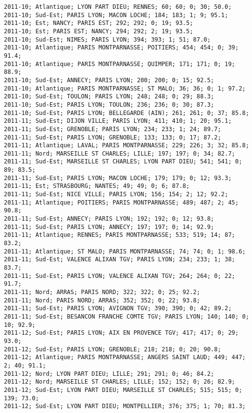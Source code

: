 \documentclass{article}
\begin{document}
\begin{Verbatim}[commandchars=\\\{\}]
2011-10; Atlantique; LYON PART DIEU; RENNES; 60; 60; 0; 30; 50.0; 
2011-10; Sud-Est; PARIS LYON; MACON LOCHE; 184; 183; 1; 9; 95.1; 
2011-10; Est; NANCY; PARIS EST; 292; 292; 0; 19; 93.5; 
2011-10; Est; PARIS EST; NANCY; 294; 292; 2; 19; 93.5; 
2011-10; Sud-Est; NIMES; PARIS LYON; 394; 393; 1; 51; 87.0; 
2011-10; Atlantique; PARIS MONTPARNASSE; POITIERS; 454; 454; 0; 39; 91.4; 
2011-10; Atlantique; PARIS MONTPARNASSE; QUIMPER; 171; 171; 0; 19; 88.9; 
2011-10; Sud-Est; ANNECY; PARIS LYON; 200; 200; 0; 15; 92.5; 
2011-10; Atlantique; PARIS MONTPARNASSE; ST MALO; 36; 36; 0; 1; 97.2; 
2011-10; Sud-Est; TOULON; PARIS LYON; 248; 248; 0; 29; 88.3; 
2011-10; Sud-Est; PARIS LYON; TOULON; 236; 236; 0; 30; 87.3; 
2011-10; Sud-Est; PARIS LYON; BELLEGARDE (AIN); 261; 261; 0; 37; 85.8; 
2011-11; Sud-Est; DIJON VILLE; PARIS LYON; 411; 410; 1; 20; 95.1; 
2011-11; Sud-Est; GRENOBLE; PARIS LYON; 234; 233; 1; 24; 89.7; 
2011-11; Sud-Est; PARIS LYON; GRENOBLE; 133; 133; 0; 17; 87.2; 
2011-11; Atlantique; LAVAL; PARIS MONTPARNASSE; 229; 226; 3; 32; 85.8; 
2011-11; Nord; MARSEILLE ST CHARLES; LILLE; 197; 197; 0; 34; 82.7; 
2011-11; Sud-Est; MARSEILLE ST CHARLES; LYON PART DIEU; 541; 541; 0; 89; 83.5; 
2011-11; Sud-Est; PARIS LYON; MACON LOCHE; 179; 179; 0; 12; 93.3; 
2011-11; Est; STRASBOURG; NANTES; 49; 49; 0; 6; 87.8; 
2011-11; Sud-Est; NICE VILLE; PARIS LYON; 156; 154; 2; 12; 92.2; 
2011-11; Atlantique; POITIERS; PARIS MONTPARNASSE; 489; 487; 2; 45; 90.8; 
2011-11; Sud-Est; ANNECY; PARIS LYON; 192; 192; 0; 12; 93.8; 
2011-11; Sud-Est; PARIS LYON; ANNECY; 197; 197; 0; 14; 92.9; 
2011-11; Atlantique; RENNES; PARIS MONTPARNASSE; 533; 519; 14; 87; 83.2; 
2011-11; Atlantique; ST MALO; PARIS MONTPARNASSE; 74; 74; 0; 1; 98.6; 
2011-11; Sud-Est; VALENCE ALIXAN TGV; PARIS LYON; 234; 233; 1; 38; 83.7; 
2011-11; Sud-Est; PARIS LYON; VALENCE ALIXAN TGV; 264; 264; 0; 22; 91.7; 
2011-11; Nord; ARRAS; PARIS NORD; 322; 322; 0; 25; 92.2; 
2011-11; Nord; PARIS NORD; ARRAS; 352; 352; 0; 22; 93.8; 
2011-11; Sud-Est; PARIS LYON; AVIGNON TGV; 390; 390; 0; 42; 89.2; 
2011-11; Sud-Est; BESANCON FRANCHE COMTE TGV; PARIS LYON; 140; 140; 0; 10; 92.9; 
2011-12; Sud-Est; PARIS LYON; AIX EN PROVENCE TGV; 417; 417; 0; 29; 93.0; 
2011-12; Sud-Est; PARIS LYON; GRENOBLE; 218; 218; 0; 20; 90.8; 
2011-12; Atlantique; PARIS MONTPARNASSE; ANGERS SAINT LAUD; 449; 447; 2; 40; 91.1; 
2011-12; Nord; LYON PART DIEU; LILLE; 291; 291; 0; 46; 84.2; 
2011-12; Nord; MARSEILLE ST CHARLES; LILLE; 152; 152; 0; 26; 82.9; 
2011-12; Sud-Est; LYON PART DIEU; MARSEILLE ST CHARLES; 515; 515; 0; 139; 73.0; 
2011-12; Sud-Est; LYON PART DIEU; MONTPELLIER; 376; 375; 1; 70; 81.3; 

\end{Verbatim}
\end{document}
